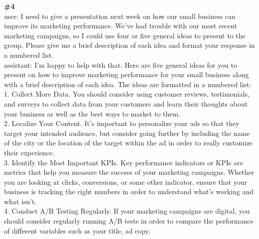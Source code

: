 \documentclass[10pt]{article}
\begin{document}
\begin{Form}
\CheckBox[name=q3n,width=1.6ex,height=1.6ex,bordercolor={0.45 0.45 0.45}]{~\textcolor{nbox}{NONE}}
\vspace{8pt}
\begin{tcolorbox}[colback=convbg,colframe=itemframe,boxrule=0.8pt,arc=2pt,breakable,left=6pt,right=6pt,top=5pt,bottom=5pt]
{\footnotesize\textbf{\#4}}\\[3pt]
{\footnotesize user: I need to give a presentation next week on how our small business can improve its marketing performance. We've had trouble with our most recent marketing campaigns, so I could use four or five general ideas to present to the group. Please give me a brief description of each idea and format your response in a numbered list. \\[2pt]
assistant: I'm happy to help with that. Here are five general ideas for you to present on how to improve marketing performance for your small business along with a brief description of each idea. The ideas are formatted in a numbered list: \\[2pt]
1. Collect More Data. You should consider using customer reviews, testimonials, and surveys to collect data from your customers and learn their thoughts about your business as well as the best ways to market to them. \\[2pt]
2. Localize Your Content. It's important to personalize your ads so that they target your intended audience, but consider going further by including the name of the city or the location of the target within the ad in order to really customize their experience. \\[2pt]
3. Identify the Most Important KPIs. Key performance indicators or KPIs are metrics that help you measure the success of your marketing campaigns. Whether you are looking at clicks, conversions, or some other indicator, ensure that your business is tracking the right numbers in order to understand what's working and what isn't. \\[2pt]
4. Conduct A/B Testing Regularly. If your marketing campaigns are digital, you should consider regularly running A/B tests in order to compare the performance of different variables such as your title, ad copy,}
\end{tcolorbox}
\vspace{-1pt}
\CheckBox[name=q4c,width=1.6ex,height=1.6ex,bordercolor={0.45 0.45 0.45}]{~\textcolor{cbox}{COMPACT}}\quad
\CheckBox[name=q4d,width=1.6ex,height=1.6ex,bordercolor={0.45 0.45 0.45}]{~\textcolor{dbox}{DIFFUSE}}\quad
\CheckBox[name=q4n,width=1.6ex,height=1.6ex,bordercolor={0.45 0.45 0.45}]{~\textcolor{nbox}{NONE}}

\end{Form}
\end{document}
